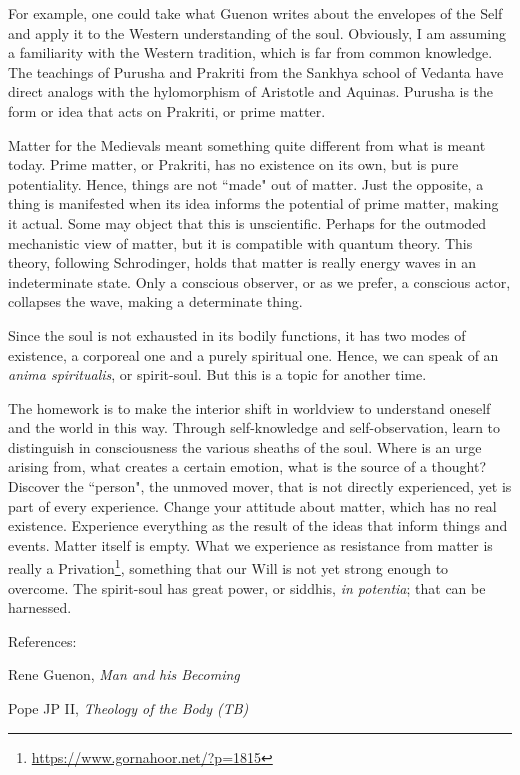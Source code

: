 For example, one could take what Guenon writes about the envelopes of the Self and apply it to the Western understanding of the soul. Obviously, I am assuming a familiarity with the Western tradition, which is far from common knowledge. The teachings of Purusha and Prakriti from the Sankhya school of Vedanta have direct analogs with the hylomorphism of Aristotle and Aquinas. Purusha is the form or idea that acts on Prakriti, or prime matter.

Matter for the Medievals meant something quite different from what is meant today. Prime matter, or Prakriti, has no existence on its own, but is pure potentiality. Hence, things are not ``made" out of matter. Just the opposite, a thing is manifested when its idea informs the potential of prime matter, making it actual. Some may object that this is unscientific. Perhaps for the outmoded mechanistic view of matter, but it is compatible with quantum theory. This theory, following Schrodinger, holds that matter is really energy waves in an indeterminate state. Only a conscious observer, or as we prefer, a conscious actor, collapses the wave, making a determinate thing.

Since the soul is not exhausted in its bodily functions, it has two modes of existence, a corporeal one and a purely spiritual one. Hence, we can speak of an \emph{anima spiritualis}, or spirit-soul. But this is a topic for another time.

The homework is to make the interior shift in worldview to understand oneself and the world in this way. Through self-knowledge and self-observation, learn to distinguish in consciousness the various sheaths of the soul. Where is an urge arising from, what creates a certain emotion, what is the source of a thought? Discover the ``person", the unmoved mover, that is not directly experienced, yet is part of every experience. Change your attitude about matter, which has no real existence. Experience everything as the result of the ideas that inform things and events. Matter itself is empty. What we experience as resistance from matter is really a Privation\footnote{\url{https://www.gornahoor.net/?p=1815}}, something that our Will is not yet strong enough to overcome. The spirit-soul has great power, or siddhis, \emph{in potentia}; that can be harnessed.

References:

Rene Guenon, \textit{Man and his Becoming}

Pope JP II, \textit{Theology of the Body (TB)}

